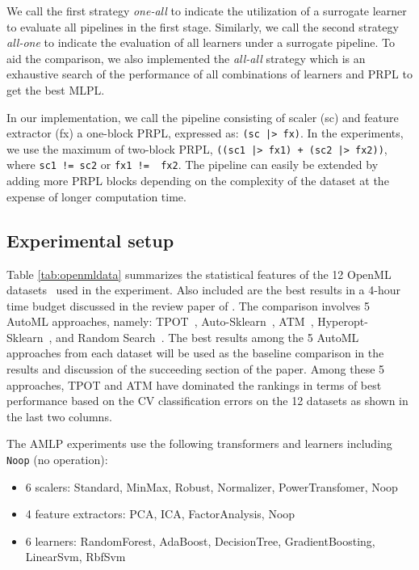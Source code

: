 \documentclass{juliacon}
\begin{document}
We call the first strategy \emph{one-all} to indicate the utilization of a
surrogate learner to evaluate all pipelines in the first stage.
Similarly, we call the second strategy \emph{all-one}
to indicate the evaluation of all learners under a
surrogate pipeline.  To aid the comparison, we also implemented the
\emph{all-all} strategy which is an exhaustive search of the performance of all
combinations of learners and PRPL to get the best MLPL.

\vskip 6pt

In our implementation, we call the pipeline consisting of scaler (sc) and
feature extractor (fx) a one-block PRPL, expressed as: \texttt{(sc~|>~fx)}.
In the experiments, we use the maximum of two-block PRPL,
\texttt{((sc1~|>~fx1)~+~(sc2~|>~fx2))}, where \texttt{sc1~!=~sc2} or
\texttt{fx1~!=~ fx2}.  The pipeline can easily be extended by adding more PRPL
blocks depending on the complexity of the dataset at the expense of longer
computation time.

\subsection{Experimental setup}



Table \ref{tab:openmldata} summarizes the statistical features of the 12 OpenML
datasets~\cite{openml} used in the experiment.  Also included are the best
results in a 4-hour time budget  discussed in the review paper
of \cite{zoller2019}.  The comparison involves 5 AutoML approaches, namely:
TPOT~\cite{tpot2016}, Auto-Sklearn~\cite{Feurer:AML2019Chp6,Feurer:NIPS2015},
ATM~\cite{atm2017}, Hyperopt-Sklearn~\cite{bergstra2011nips,bergstra2012}, and
Random Search~\cite{anderson1953}.  The best results among the 5 AutoML approaches
from each dataset  will be used as the baseline comparison in the results and discussion 
of the succeeding section of the paper. Among these 5 approaches, TPOT and ATM have
dominated the rankings in terms of best performance based on the
CV classification errors on the 12 datasets as shown in the last two columns.

\vskip 6pt

The AMLP experiments use the following transformers and learners including
\texttt{Noop} (no operation):
\begin{itemize}
  \item 6 scalers: Standard, MinMax, Robust, Normalizer, PowerTransfomer, Noop
  \item 4 feature extractors: PCA, ICA, FactorAnalysis, Noop
  \item 6 learners: RandomForest, AdaBoost, DecisionTree, GradientBoosting, LinearSvm, RbfSvm
\end{itemize}
\end{document}
